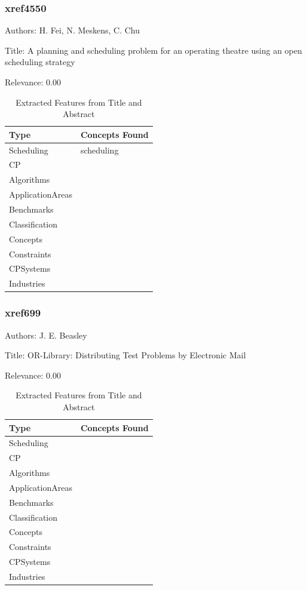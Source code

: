 \subsubsection{xref4550}
\label{mw:xref4550}

Authors: H. Fei, N. Meskens, C. Chu

Title: A planning and scheduling problem for an operating theatre using an open scheduling strategy

Relevance:  0.00

{\scriptsize
\begin{longtable}{p{2cm}p{20cm}}
\caption{Extracted Features from Title and Abstract}\\ \toprule
Type & Concepts Found\\ \midrule
\endhead
\bottomrule
\endfoot
Scheduling & scheduling\\ 
CP & \\ 
Algorithms & \\ 
ApplicationAreas & \\ 
Benchmarks & \\ 
Classification & \\ 
Concepts & \\ 
Constraints & \\ 
CPSystems & \\ 
Industries & \\ 
\end{longtable}
}



\subsubsection{xref699}
\label{mw:xref699}

Authors: J. E. Beasley

Title: OR-Library: Distributing Test Problems by Electronic Mail

Relevance:  0.00

{\scriptsize
\begin{longtable}{p{2cm}p{20cm}}
\caption{Extracted Features from Title and Abstract}\\ \toprule
Type & Concepts Found\\ \midrule
\endhead
\bottomrule
\endfoot
Scheduling & \\ 
CP & \\ 
Algorithms & \\ 
ApplicationAreas & \\ 
Benchmarks & \\ 
Classification & \\ 
Concepts & \\ 
Constraints & \\ 
CPSystems & \\ 
Industries & \\ 
\end{longtable}
}



